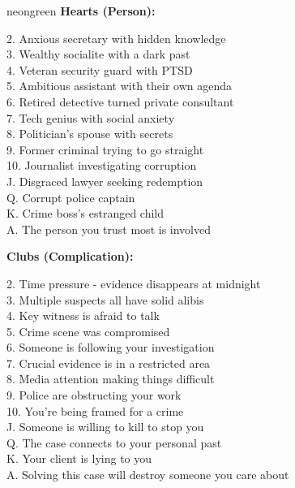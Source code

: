 \documentclass[11pt]{article}
\begin{document}
\begin{noirsection}{neongreen}
\textbf{Hearts (Person):}
\begin{small}
\begin{multicols}{2}
2. Anxious secretary with hidden knowledge\\
3. Wealthy socialite with a dark past\\
4. Veteran security guard with PTSD\\
5. Ambitious assistant with their own agenda\\
6. Retired detective turned private consultant\\
7. Tech genius with social anxiety\\
8. Politician's spouse with secrets\\
9. Former criminal trying to go straight\\
10. Journalist investigating corruption\\
J. Disgraced lawyer seeking redemption\\
Q. Corrupt police captain\\
K. Crime boss's estranged child\\
A. The person you trust most is involved
\end{multicols}
\end{small}

\textbf{Clubs (Complication):}
\begin{small}
\begin{multicols}{2}
2. Time pressure - evidence disappears at midnight\\
3. Multiple suspects all have solid alibis\\
4. Key witness is afraid to talk\\
5. Crime scene was compromised\\
6. Someone is following your investigation\\
7. Crucial evidence is in a restricted area\\
8. Media attention making things difficult\\
9. Police are obstructing your work\\
10. You're being framed for a crime\\
J. Someone is willing to kill to stop you\\
Q. The case connects to your personal past\\
K. Your client is lying to you\\
A. Solving this case will destroy someone you care about
\end{multicols}
\end{small}


\end{noirsection}
\end{document}
